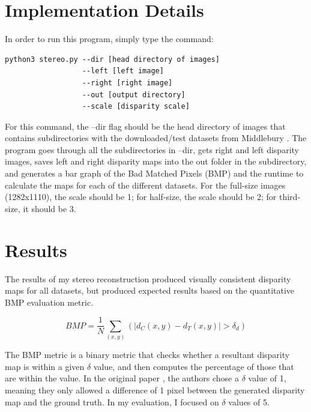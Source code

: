 \documentclass[11pt,a4paper]{article}
\begin{document}
\section{Implementation Details}

In order to run this program, simply type the command: 
\begin{Verbatim}[fontsize=\small]
python3 stereo.py --dir [head directory of images] 
                  --left [left image] 
                  --right [right image] 
                  --out [output directory] 
                  --scale [disparity scale]
\end{Verbatim}
For this command, the --dir flag should be the head directory of images that contains subdirectories 
 with the downloaded/test datasets from Middlebury \cite{Hirschmller2007EvaluationOC}. The program goes 
 through all the subdirectories in --dir, gets right and left disparity images, saves left and right disparity 
 maps into the out folder in the subdirectory, and generates a bar graph of the Bad Matched Pixels (BMP) \cite{BMP}
  and the runtime to calculate the maps for each of the different datasets. For the full-size images (1282x1110), the scale should be 1; for 
  half-size, the scale should be 2; for third-size, it should be 3.

\section{Results}

The results of my stereo reconstruction produced visually consistent disparity maps for all datasets, 
but produced expected results based on the quantitative BMP evaluation metric. 

$$BMP = \frac{1}{N} \sum_{(x, y)} (|d_{C}(x, y) - d_{T}(x, y)| > \delta_{d})$$

The BMP metric is a binary metric that checks whether a resultant disparity map is within a given $\delta$ value,
 and then computes the percentage of those that are within the value. In the original paper \cite{BMP}, the authors 
 chose a $\delta$ value of 1, meaning they only allowed a difference of 1 pixel between the generated disparity map and the ground 
 truth. In my evaluation, I focused on $\delta$ values of 5.
\end{document}
